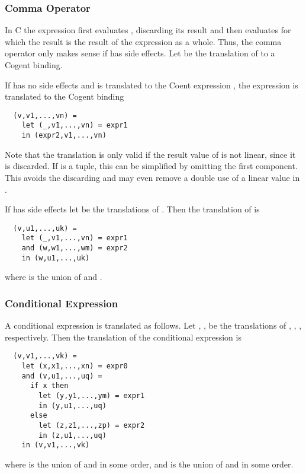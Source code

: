 \subsubsection{Comma Operator}

In C the expression  first evaluates , discarding its result and then evaluates  for which
the result is the result of the expression as a whole. Thus, the comma operator only makes sense if  has side
effects. Let  be the translation of  to a Cogent binding.

If  has no side effects and is translated to the Coent expression , the expression 
is translated to the Cogent binding
\begin{verbatim}
  (v,v1,...,vn) = 
    let (_,v1,...,vn) = expr1
    in (expr2,v1,...,vn) 
\end{verbatim}
Note that the translation is only valid if the result value of  is not linear, since it is discarded. If 
 is a tuple, this can be simplified by omitting the first component. This avoids the discarding and 
may even remove a double use of a linear value in .

If  has side effects let  be the translations of . Then the translation of 
 is 
\begin{verbatim}
  (v,u1,...,uk) = 
    let (_,v1,...,vn) = expr1
    and (w,w1,...,wm) = expr2
    in (w,u1,...,uk) 
\end{verbatim}
where  is the union of  and . 

\subsubsection{Conditional Expression}

A conditional expression  is translated as follows. Let , 
,  be the translations of 
, , , respectively.
Then the translation of the conditional expression is 
\begin{verbatim}
  (v,v1,...,vk) = 
    let (x,x1,...,xn) = expr0
    and (v,u1,...,uq) =
      if x then 
        let (y,y1,...,ym) = expr1 
        in (y,u1,...,uq)
      else
        let (z,z1,...,zp) = expr2
        in (z,u1,...,uq)
    in (v,v1,...,vk) 
\end{verbatim}
where  is the union of  and  in some order, and 
 is the union of  and  in some order.

